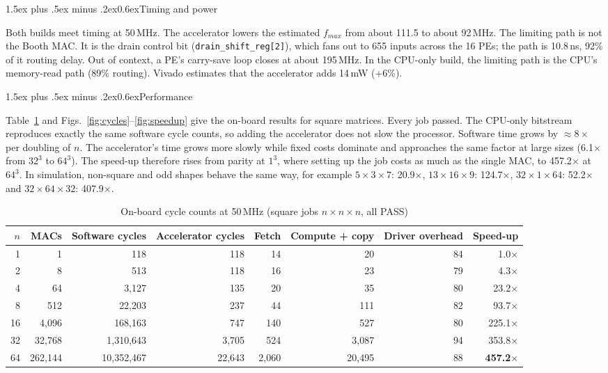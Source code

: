 \documentclass[10pt,twocolumn,a4paper]{article}
\makeatletter
\renewcommand\subsection{\@startsection{subsection}{2}{\z@}%
  {1.5ex plus .5ex minus .2ex}{0.6ex}{\normalfont\itshape}}
\makeatother
\begin{document}
\subsection{Timing and power}

Both builds meet timing at 50\,MHz. The accelerator lowers the estimated
$f_{max}$ from about 111.5 to about 92\,MHz. The limiting path is not the Booth
MAC. It is the drain control bit (\texttt{drain\_shift\_reg[2]}), which fans
out to 655 inputs across the 16 PEs; the path is 10.8\,ns, 92\% of it routing
delay. Out of context, a PE's carry-save loop closes at about 195\,MHz. In the
CPU-only build, the limiting path is the CPU's memory-read path (89\% routing).
Vivado estimates that the accelerator adds 14\,mW (+6\%).

\subsection{Performance}

Table~\ref{tab:perf} and Figs.~\ref{fig:cycles}--\ref{fig:speedup} give the
on-board results for square matrices. Every job passed. The CPU-only bitstream
reproduces exactly the same software cycle counts, so adding the accelerator
does not slow the processor. Software time grows by $\approx8\times$ per
doubling of $n$. The accelerator's time grows more slowly while fixed costs
dominate and approaches the same factor at large sizes (6.1$\times$ from
$32^3$ to $64^3$). The speed-up therefore rises from parity at $1^3$, where
setting up the job costs as much as the single MAC, to 457.2$\times$ at
$64^3$. In simulation, non-square and odd shapes behave the same way, for
example $5\times3\times7$: 20.9$\times$, $13\times16\times9$: 124.7$\times$,
$32\times1\times64$: 52.2$\times$ and $32\times64\times32$: 407.9$\times$.

\begin{table}[t]
\caption{On-board cycle counts at 50\,MHz (square jobs $n\times n\times n$, all PASS)}\label{tab:perf}
\centering\footnotesize
\begin{tabular}{rrrrrrrr}
\toprule
$n$ & MACs & Software cycles & Accelerator cycles & Fetch & Compute + copy & Driver overhead & Speed-up \\
\midrule
1 & 1 & 118 & 118 & 14 & 20 & 84 & 1.0$\times$ \\
2 & 8 & 513 & 118 & 16 & 23 & 79 & 4.3$\times$ \\
4 & 64 & 3,127 & 135 & 20 & 35 & 80 & 23.2$\times$ \\
8 & 512 & 22,203 & 237 & 44 & 111 & 82 & 93.7$\times$ \\
16 & 4,096 & 168,163 & 747 & 140 & 527 & 80 & 225.1$\times$ \\
32 & 32,768 & 1,310,643 & 3,705 & 524 & 3,087 & 94 & 353.8$\times$ \\
64 & 262,144 & 10,352,467 & 22,643 & 2,060 & 20,495 & 88 & \textbf{457.2$\times$} \\
\bottomrule
\end{tabular}
\end{table}
\end{document}
